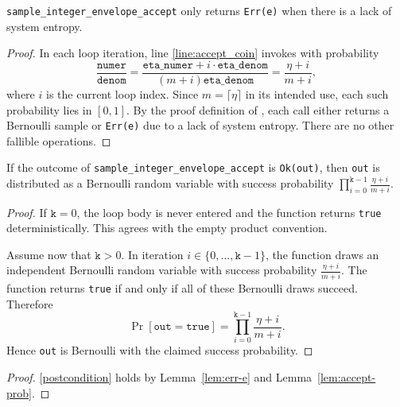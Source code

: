 \documentclass{article}
\begin{document}
\begin{lemma}
\label{lem:err-e}
\texttt{sample\_integer\_envelope\_accept} only returns \texttt{Err(e)} when there is a lack of system entropy.
\end{lemma}
\begin{proof}
In each loop iteration, line \ref{line:accept_coin} invokes
with probability
\begin{equation*}
\frac{\texttt{numer}}{\texttt{denom}}
= \frac{\texttt{eta\_numer} + i \cdot \texttt{eta\_denom}}{(m + i)\texttt{eta\_denom}}
= \frac{\eta + i}{m + i},
\end{equation*}
where $i$ is the current loop index.
Since $m = \lceil \eta \rceil$ in its intended use, each such probability lies in $[0,1]$.
By the proof definition of
,
each call either returns a Bernoulli sample or \texttt{Err(e)} due to a lack of system entropy.
There are no other fallible operations.
\end{proof}

\begin{lemma}
\label{lem:accept-prob}
If the outcome of \texttt{sample\_integer\_envelope\_accept} is \texttt{Ok(out)}, then \texttt{out}
is distributed as a Bernoulli random variable with success probability
$\prod_{i=0}^{\texttt{k}-1} \frac{\eta + i}{m + i}$.
\end{lemma}
\begin{proof}
If $\texttt{k} = 0$, the loop body is never entered and the function returns \texttt{true} deterministically.
This agrees with the empty product convention.

Assume now that $\texttt{k} > 0$.
In iteration $i \in \{0,\ldots,\texttt{k}-1\}$, the function draws an independent Bernoulli random variable
with success probability $\frac{\eta + i}{m + i}$.
The function returns \texttt{true} if and only if all of these Bernoulli draws succeed.
Therefore
\begin{equation*}
\Pr[\texttt{out} = \texttt{true}] = \prod_{i=0}^{\texttt{k}-1} \frac{\eta + i}{m + i}.
\end{equation*}
Hence \texttt{out} is Bernoulli with the claimed success probability.
\end{proof}

\begin{proof}
\ref{postcondition} holds by Lemma~\ref{lem:err-e} and Lemma~\ref{lem:accept-prob}.
\end{proof}
\end{document}
